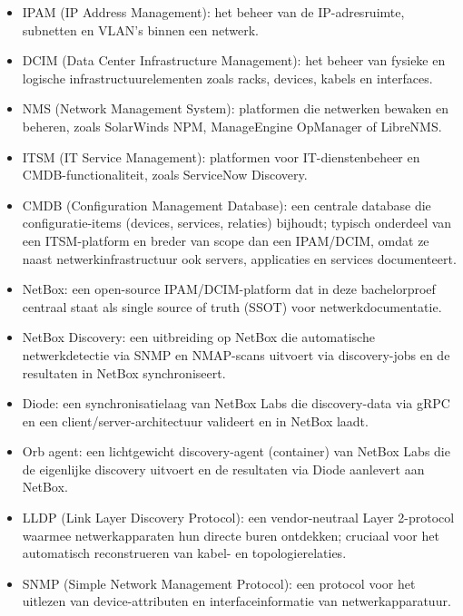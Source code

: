 \begin{itemize}
  \item IPAM (IP Address Management): het beheer van de IP-adresruimte, subnetten en VLAN's binnen een netwerk.
  \item DCIM (Data Center Infrastructure Management): het beheer van fysieke en logische infrastructuurelementen zoals racks, devices, kabels en interfaces.
  \item NMS (Network Management System): platformen die netwerken bewaken en beheren, zoals SolarWinds NPM\autocite{SolarWindsNPM}, ManageEngine OpManager\autocite{ManageEngineOpManager} of LibreNMS\autocite{LibreNMS}.
  \item ITSM (IT Service Management): platformen voor IT-dienstenbeheer en CMDB-functionaliteit, zoals ServiceNow Discovery\autocite{ServiceNowDiscovery}.
  \item CMDB (Configuration Management Database): een centrale database die configuratie-items (devices, services, relaties) bijhoudt; typisch onderdeel van een ITSM-platform en breder van scope dan een IPAM/DCIM, omdat ze naast netwerkinfrastructuur ook servers, applicaties en services documenteert.
  \item NetBox: een open-source IPAM/DCIM-platform dat in deze bachelorproef centraal staat als single source of truth (SSOT) voor netwerkdocumentatie\autocite{NetBoxOSS}.
  \item NetBox Discovery: een uitbreiding op NetBox die automatische netwerkdetectie via SNMP en NMAP-scans uitvoert via discovery-jobs en de resultaten in NetBox synchroniseert\autocite{NetBoxDiscoveryDocs}.
  \item Diode: een synchronisatielaag van NetBox Labs die discovery-data via gRPC en een client/server-architectuur valideert en in NetBox laadt\autocite{DiodeDocs}.
  \item Orb agent: een lichtgewicht discovery-agent (container) van NetBox Labs die de eigenlijke discovery uitvoert en de resultaten via Diode aanlevert aan NetBox\autocite{NetBoxLabsOrbAgent}.
  \item LLDP (Link Layer Discovery Protocol): een vendor-neutraal Layer 2-protocol waarmee netwerkapparaten hun directe buren ontdekken; cruciaal voor het automatisch reconstrueren van kabel- en topologierelaties\autocite{LLDP_IJCA}.
  \item SNMP (Simple Network Management Protocol): een protocol voor het uitlezen van device-attributen en interfaceinformatie van netwerkapparatuur\autocite{SnmpTopologyDiscoveryIEEE2013}.
\end{itemize}


